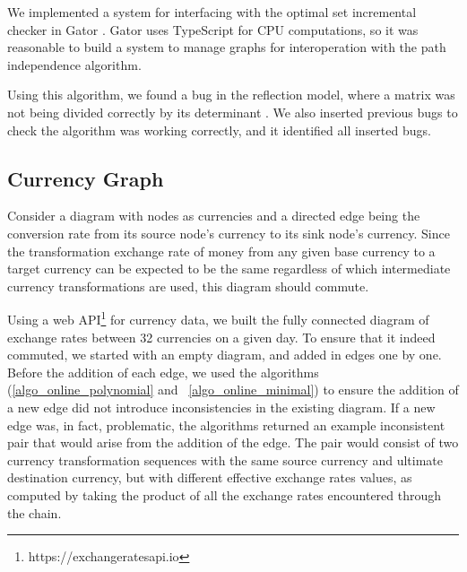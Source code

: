 \documentclass[sigplan,review,anonymous]{acmart}
\begin{document}
{We implemented a system for interfacing with the optimal set incremental checker in Gator .  Gator uses TypeScript for CPU computations, so it was reasonable to build a system to manage graphs for interoperation with the path independence algorithm.

Using this algorithm, we found a bug in the reflection model, where a matrix was not being divided correctly by its determinant .  We also inserted previous bugs to check the algorithm was working correctly, and it identified all inserted bugs.

\subsection{Currency Graph}
\label{sec:currency}


Consider a diagram with nodes as currencies and a directed edge being the
conversion rate from its source node's currency to its sink node's currency.
Since the transformation exchange rate of money from any given base currency to a target currency
can be expected to be the same regardless of which intermediate currency transformations
are used, this diagram should commute.

Using a web API\footnote{https://exchangeratesapi.io} for currency data, we built the fully connected diagram of exchange rates between 32 currencies on a given day.
To ensure that it indeed commuted, we started with an empty diagram, and added in edges one by one.
Before the addition of each edge, we used the algorithms (\ref{algo_online_polynomial} and ~\ref{algo_online_minimal})  to ensure the addition of a new edge did not introduce inconsistencies in the existing diagram.
If a new edge was, in fact, problematic, the algorithms returned an example inconsistent
pair that would arise from the addition of the edge.
The pair would consist of two currency transformation sequences with the 
same source currency and ultimate destination currency, but with different effective 
exchange rates values, as computed by taking the product of all the exchange rates
encountered through the chain.

}
\end{document}
